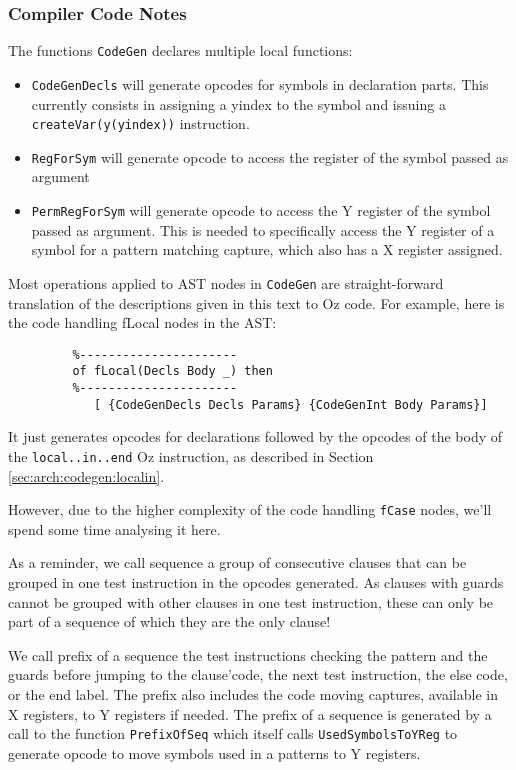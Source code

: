 \documentclass[a4paper]{memoir}
\begin{document}
\subsubsection{Compiler Code Notes}
The functions \lstinline!CodeGen! declares multiple local functions:
\begin{itemize}
  \item \lstinline!CodeGenDecls! will generate opcodes for symbols in
    declaration parts. This currently consists in assigning a yindex to the
    symbol and issuing a \lstinline!createVar(y(yindex))! instruction.
  \item \lstinline!RegForSym! will generate opcode to access the register of the
    symbol passed as argument
  \item \lstinline!PermRegForSym! will generate opcode to access the Y register
    of the symbol passed as argument. This is needed to specifically access the
    Y register of a symbol for a pattern matching capture, which also has a X
    register assigned.
\end{itemize}

Most operations applied to AST nodes in \lstinline!CodeGen! are straight-forward translation of the
descriptions given in this text to Oz code. For example, here is the
code handling fLocal nodes in the AST:

\begin{lstlisting}
         %----------------------
         of fLocal(Decls Body _) then
         %----------------------
            [ {CodeGenDecls Decls Params} {CodeGenInt Body Params}]
\end{lstlisting}

It just generates opcodes for declarations followed by the opcodes of the body
of the \lstinline!local..in..end! Oz instruction, as described in Section
\ref{sec:arch:codegen:localin}.

However, due to the higher complexity of the code handling \lstinline!fCase! nodes, we'll
spend some time analysing it here.

As a reminder, we call sequence a group of consecutive clauses that can be
grouped in one test instruction in the opcodes generated. As clauses with guards
cannot be grouped with other clauses in one test instruction, these
can only be part of a sequence of which they are the only clause!

We call prefix of a sequence the test
instructions checking the pattern and the guards before jumping to the
clause'code, the next test instruction, the else code, or the end label.
The prefix also includes the code moving captures, available in X registers,
to Y registers if needed.
The prefix of a sequence is generated by a call to the function
\lstinline!PrefixOfSeq! which itself calls \lstinline!UsedSymbolsToYReg! to
generate opcode to move symbols used in a patterns to Y registers.
\end{document}
